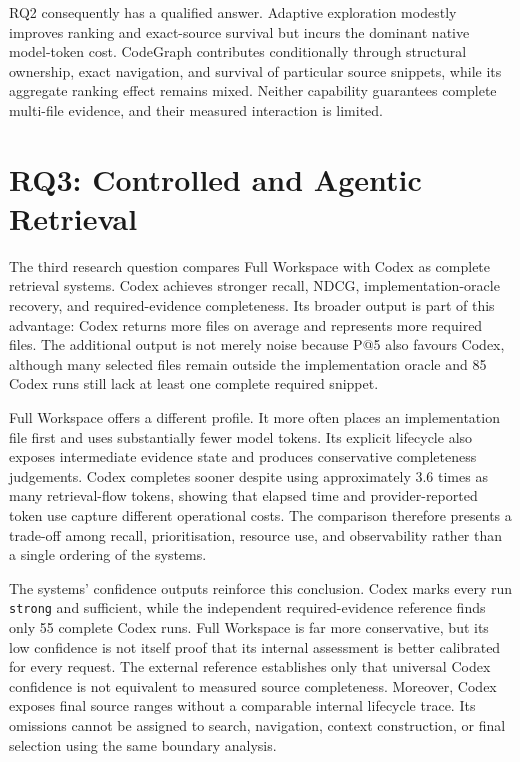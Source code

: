 RQ2 consequently has a qualified answer. Adaptive exploration modestly improves ranking and exact-source survival but incurs the dominant native model-token cost. CodeGraph contributes conditionally through structural ownership, exact navigation, and survival of particular source snippets, while its aggregate ranking effect remains mixed. Neither capability guarantees complete multi-file evidence, and their measured interaction is limited.

\section{RQ3: Controlled and Agentic Retrieval}\label{sec:rq3-controlled-and-agentic-retrieval}

The third research question compares Full Workspace with Codex as complete retrieval systems. Codex achieves stronger recall, NDCG, implementation-oracle recovery, and required-evidence completeness. Its broader output is part of this advantage: Codex returns more files on average and represents more required files. The additional output is not merely noise because P@5 also favours Codex, although many selected files remain outside the implementation oracle and 85 Codex runs still lack at least one complete required snippet.

Full Workspace offers a different profile. It more often places an implementation file first and uses substantially fewer model tokens. Its explicit lifecycle also exposes intermediate evidence state and produces conservative completeness judgements. Codex completes sooner despite using approximately 3.6 times as many retrieval-flow tokens, showing that elapsed time and provider-reported token use capture different operational costs. The comparison therefore presents a trade-off among recall, prioritisation, resource use, and observability rather than a single ordering of the systems.

The systems' confidence outputs reinforce this conclusion. Codex marks every run \texttt{strong} and sufficient, while the independent required-evidence reference finds only 55 complete Codex runs. Full Workspace is far more conservative, but its low confidence is not itself proof that its internal assessment is better calibrated for every request. The external reference establishes only that universal Codex confidence is not equivalent to measured source completeness. Moreover, Codex exposes final source ranges without a comparable internal lifecycle trace. Its omissions cannot be assigned to search, navigation, context construction, or final selection using the same boundary analysis.

